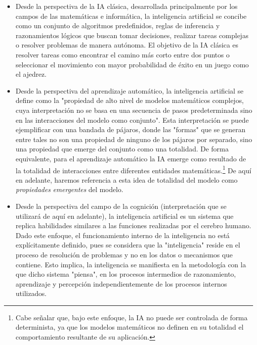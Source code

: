 \begin{itemize}
	\item Desde la perspectiva de la IA clásica, desarrollada principalmente por
	      los campos de las matemáticas e informática, la inteligencia artificial se
	      concibe como un conjunto de algoritmos predefinidos, reglas de inferencia y
	      razonamientos lógicos que buscan tomar decisiones, realizar tareas complejas
	      o resolver problemas de manera autónoma. El objetivo de la IA clásica es
	      resolver tareas como encontrar el camino más corto entre dos puntos o
	      seleccionar el movimiento con mayor probabilidad de éxito en un juego como
	      el ajedrez.

	\item Desde la perspectiva del aprendizaje automático, la inteligencia
	      artificial se define como la "propiedad de alto nivel de modelos matemáticos
	      complejos, cuya interpretación no se basa en una secuencia de pasos
	      predeterminada sino en las interacciones del modelo como conjunto". Esta
		  interpretación se puede ejemplificar con una bandada de pájaros, donde
		  las "formas" que se generan entre tales no son una propiedad de ninguno de los
		  pájaros por separado, sino una propiedad que emerge del conjunto como
		  una totalidad. De forma equivalente, para el aprendizaje automático la IA
	      emerge como resultado de la totalidad de interacciones entre diferentes entidades
	      matemáticas.\footnote{Cabe señalar que, bajo este enfoque, la IA no puede
		      ser controlada de forma determinista, ya que los modelos matemáticos no
		      definen en su totalidad el comportamiento resultante de su aplicación.}
		  De aquí en adelante, haremos referencia a esta idea de totalidad 
		  del modelo como \emph{propiedades emergentes} del modelo. 

	\item Desde la perspectiva del campo de la cognición (interpretación que se
	      utilizará de aquí en adelante), la inteligencia artificial
	      es un sistema que replica habilidades similares a las funciones realizadas 
		  por el cerebro humano. Dado este enfoque, el funcionamiento interno de la 
		  inteligencia no está explícitamente definido, pues se considera que la 
		  "inteligencia" reside en el proceso de resolución de problemas y no en 
		  los datos o mecanismos que contiene. Esto implica, la inteligencia se 
		  manifiesta en la metodología con la que dicho sistema "piensa", en 
		  los procesos intermedios de razonamiento, aprendizaje y percepción 
		  independientemente de los procesos internos utilizados.

\end{itemize}


